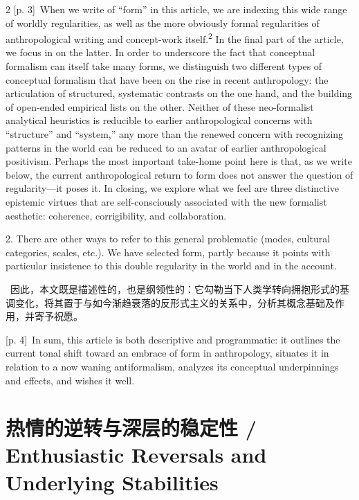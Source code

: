 \documentclass[10pt,a4paper]{article}
\begin{document}
\begin{paracol}{2}
\switchcolumn
{\scriptsize\color{gray} [p. 3]}\ When we write of “form” in this article, we are indexing this wide range of worldly regularities, as well as the more obviously formal regularities of anthropological writing and concept-work itself.\textsuperscript{2} In the final part of the article, we focus in on the latter. In order to underscore the fact that conceptual formalism can itself take many forms, we distinguish two different types of conceptual formalism that have been on the rise in recent anthropology: the articulation of structured, systematic contrasts on the one hand, and the building of open-ended empirical lists on the other. Neither of these neo-formalist analytical heuristics is reducible to earlier anthropological concerns with “structure” and “system,” any more than the renewed concern with recognizing patterns in the world can be reduced to an avatar of earlier anthropological positivism. Perhaps the most important take-home point here is that, as we write below, the current anthropological return to form does not answer the question of regularity—it poses it. In closing, we explore what we feel are three distinctive epistemic virtues that are self-consciously associated with the new formalist aesthetic: coherence, corrigibility, and collaboration.\par{\small 2. There are other ways to refer to this general problematic (modes, cultural categories, scales, etc.). We have selected form, partly because it points with particular insistence to this double regularity in the world and in the account.\par}
\switchcolumn*
{\scriptsize\color{gray} [p. 4]}\ 因此，本文既是描述性的，也是纲领性的：它勾勒当下人类学转向拥抱形式的基调变化，将其置于与如今渐趋衰落的反形式主义的关系中，分析其概念基础及作用，并寄予祝愿。\par
\switchcolumn
{\scriptsize\color{gray} [p. 4]}\ In sum, this article is both descriptive and programmatic: it outlines the current tonal shift toward an embrace of form in anthropology, situates it in relation to a now waning antiformalism, analyzes its conceptual underpinnings and effects, and wishes it well.\par
\switchcolumn*
\end{paracol}
\section*{热情的逆转与深层的稳定性 / Enthusiastic Reversals and Underlying Stabilities}
\end{document}
